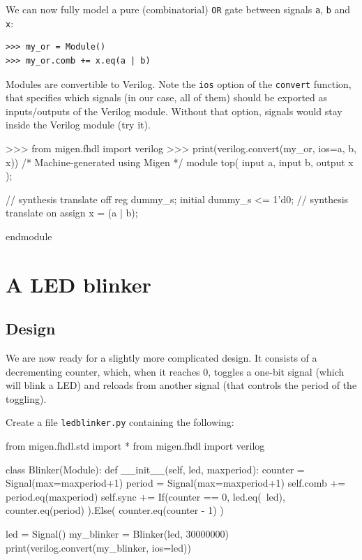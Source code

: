 \documentclass[11pt]{paper}
\begin{document}

We can now fully model a pure (combinatorial) \verb!OR! gate between signals \verb!a!, \verb!b! and \verb!x!:
\begin{verbatim}
>>> my_or = Module()
>>> my_or.comb += x.eq(a | b)
\end{verbatim}

Modules are convertible to Verilog. Note the \verb!ios! option of the \verb!convert! function, that specifies which signals (in our case, all of them) should be exported as inputs/outputs of the Verilog module. Without that option, signals would stay inside the Verilog module (try it).
\begin{verbatimtab}
>>> from migen.fhdl import verilog
>>> print(verilog.convert(my_or, ios={a, b, x}))
/* Machine-generated using Migen */
module top(
        input a,
        input b,
        output x
);


// synthesis translate off
reg dummy_s;
initial dummy_s <= 1'd0;
// synthesis translate on
assign x = (a | b);

endmodule
\end{verbatimtab}

\section{A LED blinker}
\subsection{Design}
We are now ready for a slightly more complicated design. It consists of a decrementing counter, which, when it reaches 0, toggles a one-bit signal (which will blink a LED) and reloads from another signal (that controls the period of the toggling).

Create a file \verb!ledblinker.py! containing the following:

\begin{verbatimtab}
from migen.fhdl.std import *
from migen.fhdl import verilog

class Blinker(Module):
	def __init__(self, led, maxperiod):
		counter = Signal(max=maxperiod+1)
		period = Signal(max=maxperiod+1)
		self.comb += period.eq(maxperiod)
		self.sync += If(counter == 0,
				led.eq(~led),
				counter.eq(period)
			).Else(
				counter.eq(counter - 1)
			)

led = Signal()
my_blinker = Blinker(led, 30000000)
print(verilog.convert(my_blinker, ios={led}))
\end{verbatimtab}
\end{document}
